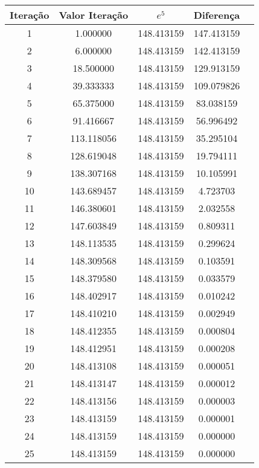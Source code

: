		\begin{table}[H]
			\centering
			\begin{tabular}{|c|c|c|c|c|}
				\hline
				Iteração & Valor Iteração & $e^5$ & Diferença \\
				\hline
				1 & 1.000000 & 148.413159 & 147.413159\\
				\hline
				2 & 6.000000 & 148.413159 & 142.413159\\
				\hline
				3 & 18.500000 & 148.413159 & 129.913159\\
				\hline
				4 & 39.333333 & 148.413159 & 109.079826\\
				\hline
				5 & 65.375000 & 148.413159 & 83.038159\\
				\hline
				6 & 91.416667 & 148.413159 & 56.996492\\
				\hline
				7 & 113.118056 & 148.413159 & 35.295104\\
				\hline
				8 & 128.619048 & 148.413159 & 19.794111\\
				\hline
				9 & 138.307168 & 148.413159 & 10.105991\\
				\hline
				10 & 143.689457 & 148.413159 & 4.723703\\
				\hline
				11 & 146.380601 & 148.413159 & 2.032558\\
				\hline
				12 & 147.603849 & 148.413159 & 0.809311\\
				\hline
				13 & 148.113535 & 148.413159 & 0.299624\\
				\hline
				14 & 148.309568 & 148.413159 & 0.103591\\
				\hline
				15 & 148.379580 & 148.413159 & 0.033579\\
				\hline
				16 & 148.402917 & 148.413159 & 0.010242\\
				\hline
				17 & 148.410210 & 148.413159 & 0.002949\\
				\hline
				18 & 148.412355 & 148.413159 & 0.000804\\
				\hline
				19 & 148.412951 & 148.413159 & 0.000208\\
				\hline
				20 & 148.413108 & 148.413159 & 0.000051\\
				\hline
				21 & 148.413147 & 148.413159 & 0.000012\\
				\hline
				22 & 148.413156 & 148.413159 & 0.000003\\
				\hline
				23 & 148.413159 & 148.413159 & 0.000001\\
				\hline
				24 & 148.413159 & 148.413159 & 0.000000\\
				\hline
				25 & 148.413159 & 148.413159 & 0.000000\\

\end{tabular}
\end{table}

